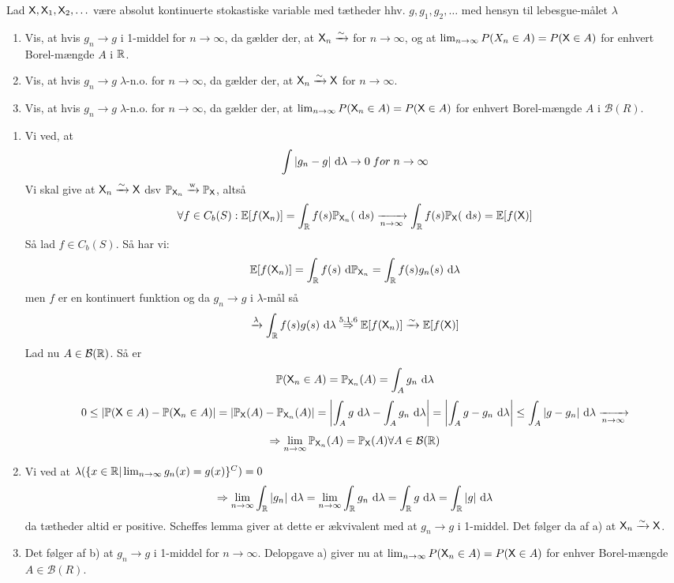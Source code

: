 \documentclass{Class}
\begin{document}
Lad $\mathsf{X}, \mathsf{X}_1,\mathsf{X}_2,\ldots$ være absolut kontinuerte stokastiske variable med tætheder hhv. $g,g_1, g_2,\ldots$ med hensyn til lebesgue-målet $\lambda$
\begin{enumerate}
    \item Vis, at hvis $g_n\rightarrow g$ i 1-middel for $n\rightarrow \infty$, da gælder der, at $\mathsf{X}_n\xrightarrow{\sim}$ for $n\rightarrow \infty$, og at $\lim_{n\rightarrow\infty} P(X_n\in A)=P(\mathsf{X}\in A)$ for enhvert Borel-mængde $A$ i $\mathbb{R}$.
    \item Vis, at hvis $g_n\rightarrow g\; \lambda$-n.o. for $n\rightarrow\infty$, da gælder der, at $\mathsf{X}_n\xrightarrow{\sim}\mathsf{X}$ for $n\rightarrow\infty$.
    \item Vis, at hvis $g_n\rightarrow g\; \lambda$-n.o. for $n\rightarrow \infty$, da gælder der, at $\lim_{n\rightarrow\infty}P(\mathsf{X}_n\in A)=P(\mathsf{X}\in A)$ for enhvert Borel-mængde $A$ i $\mathcal{B}(R)$.
\end{enumerate}
\solution
\begin{enumerate}
    \item Vi ved, at $$\int|g_n-g|\mathrm{~d}\lambda\rightarrow 0 \; for \; n\rightarrow\infty$$ Vi skal give at $\mathsf{X}_n\xrightarrow{\sim}\mathsf{X}$ dsv $\mathbb{P}_{\mathsf{X}_n}\xrightarrow{\mathrm{w}}\mathbb{P}_{\mathsf{X}}$, altså
    $$\forall f\in C_b(S):\mathbb{E}[f(\mathsf{X}_n)]=\int_{\mathbb{R}} f(s)\mathbb{P}_{\mathsf{X}_n}(\mathrm{~d} s)\xrightarrow[n\rightarrow\infty]{}\int_{\mathbb{R}} f(s)\mathbb{P}_{\mathsf{X}}(\mathrm{~d} s)=\mathbb{E}[f(\mathsf{X})]$$
    Så lad $f\in C_b(S)$. Så har vi:
    $$\mathbb{E}[f(\mathsf{X}_n)]=\int_{\mathbb{R}} f(s)\mathrm{~d}\mathbb{P}_{\mathsf{X}_n}=\int_{\mathbb{R}} f(s)g_n(s)\mathrm{~d}\lambda$$
    men $f$ er en kontinuert funktion og da $g_n\rightarrow g$ i $\lambda$-mål så 
    $$\xrightarrow{\lambda}\int_{\mathbb{R}} f(s)g(s)\mathrm{~d}\lambda \stackrel{5.1.6}{\Rightarrow} \mathbb{E}[f(\mathsf{X}_n)]\xrightarrow{\sim}\mathbb{E}[f(\mathsf{X})]$$
    Lad nu $A\in\mathcal{B}(\mathbb{R})$. Så er $$\mathbb{P}(\mathsf{X}_n\in A)=\mathbb{P}_{\mathsf{X}_n}(A)=\int_Ag_n\mathrm{~d}\lambda$$
    $$0\leq \left| \mathbb{P}(\mathsf{X}\in A)-\mathbb{P}(\mathsf{X}_n\in A)\right|=|\mathbb{P}_{\mathsf{X}}(A)-\mathbb{P}_{\mathsf{X}_n}(A)|=\left|\int_A g\mathrm{~d}\lambda-\int_Ag_n\mathrm{~d}\lambda\right|=\left|\int_Ag-g_n\mathrm{~d}\lambda\right|\leq \int_A|g-g_n|\mathrm{~d}\lambda \xrightarrow[n\rightarrow\infty]{}$$
    $$\Rightarrow \lim_{n\rightarrow \infty}\mathbb{P}_{\mathsf{X}_n}(A)=\mathbb{P}_{\mathsf{X}}(A)\forall A\in\mathcal{B}(\mathbb{R})$$
    \item Vi ved at $\lambda(\{x\in\mathbb{R}|\lim_{n\rightarrow\infty}g_n(x)=g(x)\}^C)=0$
    $$\Rightarrow \lim_{n\rightarrow\infty}\int_{\mathbb{R}} |g_n|\mathrm{~d}\lambda =\lim_{n\rightarrow\infty}\int_{\mathbb{R}} g_n\mathrm{~d}\lambda =\int_{\mathbb{R}} g\mathrm{~d}\lambda = \int_{\mathbb{R}} |g|\mathrm{~d}\lambda$$ da tætheder altid er positive. Scheffes lemma giver at dette er ækvivalent med at $g_n\rightarrow g$ i 1-middel. Det følger da af a) at $\mathsf{X}_n\xrightarrow{\sim}\mathsf{X}$.
    \item Det følger af b) at $g_n\rightarrow g$ i 1-middel for $n\rightarrow \infty$. Delopgave a) giver nu at $\lim_{n\rightarrow\infty}P(\mathsf{X}_n\in A)=P(\mathsf{X}\in A)$ for enhver Borel-mængde $A\in\mathcal{B}(R)$.
\end{enumerate}
\end{document}
